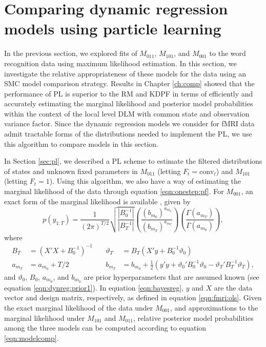 \section{Comparing dynamic regression models using particle learning \label{sec:fmri:pl}}

In the previous section, we explored fits of $M_{011}$, $M_{101}$, and $M_{001}$ to the word recognition data using maximum likelihood estimation. In this section, we investigate the relative appropriateness of these models for the data using an SMC model comparison strategy. Results in Chapter \ref{ch:comp} showed that the performance of PL is superior to the RM and KDPF in terms of efficiently and accurately estimating the marginal likelihood and posterior model probabilities within the context of the local level DLM with common state and observation variance factor. Since the dynamic regression models we consider for fMRI data admit tractable forms of the distributions needed to implement the PL, we use this algorithm to compare models in this section.

In Section \ref{sec:pl}, we described a PL scheme to estimate the filtered distributions of states and unknown fixed parameters in $M_{011}$ (letting $F_t = \mbox{conv}_t$) and $M_{101}$ (letting $F_t = 1$). Using this algorithm, we also have a way of estimating the marginal likelihood of the data through equation \eqref{eqn:onestep:pf}. For $M_{001}$, an exact form of the marginal likelihood is available \citep{ohagan:bayes:1994}, given by
\begin{equation}
p(y_{1:T}) = \frac{1}{(2\pi)^{T/2}}\sqrt{\frac{|B_0^{-1}|}{|B_T^{-1}|}}\left(\frac{(b_{m_0})^{a_{m_0}}}{(b_{m_T})^{a_{m_T}}}\right)\left(\frac{\Gamma(a_{m_T})}{\Gamma(a_{m_0})}\right), \label{eqn:ols:marglik}
\end{equation}
where
\begin{align}
B_T &= (X'X + B_0^{-1})^{-1} &\quad \vartheta_T &= B_T(X'y + B_0^{-1}\vartheta_0) \label{eqn:bayesreg} \\
a_{m_T} &= a_{m_0} + T/2 &\quad b_{m_T} &= b_{m_0} + \frac{1}{2}(y'y + \vartheta_0'B_0^{-1}\vartheta_0 - \vartheta_T'B_T^{-1}\vartheta_T), \nonumber
\end{align}
and $\vartheta_0$, $B_0$, $a_{m_0}$, and $b_{m_0}$ are prior hyperparameters that are assumed known (see equation \ref{eqn:dynreg:prior1}). In equation \eqref{eqn:bayesreg}, $y$ and $X$ are the data vector and design matrix, respectively, as defined in equation \eqref{eqn:fmri:ols}. Given the exact marginal likelihood of the data under $M_{001}$, and approximations to the marginal likelihood under $M_{101}$ and $M_{011}$, relative posterior model probabilities among the three models can be computed according to equation \eqref{eqn:modelcomp}.

